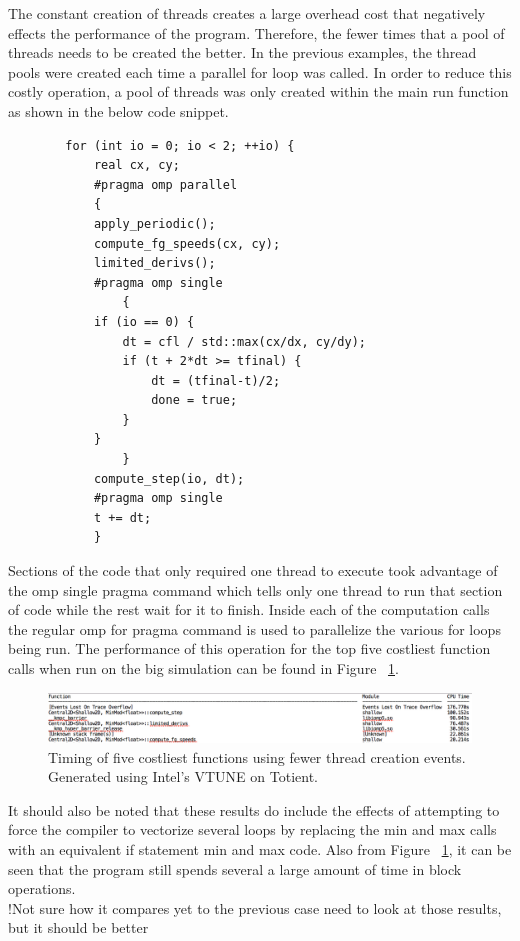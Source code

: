 \documentclass[12pt]{article}
\begin{document}
		The constant creation of threads creates a large overhead cost that negatively effects the performance of the program. Therefore, the fewer times that a pool of threads needs to be created the better. In the previous examples, the thread pools were created each time a parallel for loop was called. In order to reduce this costly operation, a pool of threads was only  created within the main run function as shown in the below code snippet.
		
		\begin{verbatim}
	    for (int io = 0; io < 2; ++io) {
            real cx, cy;
            #pragma omp parallel
            {
            apply_periodic();
            compute_fg_speeds(cx, cy);
            limited_derivs();
            #pragma omp single
                {
            if (io == 0) {
                dt = cfl / std::max(cx/dx, cy/dy);
                if (t + 2*dt >= tfinal) {
                    dt = (tfinal-t)/2;
                    done = true;
                }
            }
                }
            compute_step(io, dt);
            #pragma omp single
            t += dt;
            }

		\end{verbatim}
		
		\noindent Sections of the code that only required one thread to execute took advantage of the omp single pragma command which tells only one thread to run that section of code while the rest wait for it to finish. Inside each of the computation calls the regular omp for pragma command is used to parallelize the various for loops being run. The performance of this operation for the top five costliest function calls when run on the big simulation can be found in Figure ~\ref{ThreadMovement}.
		
		\begin{figure}[h]
			\begin{center}
				\includegraphics[width=0.8\columnwidth]{ThreadMovement}
				\caption{Timing of five costliest functions using fewer thread creation events. Generated using Intel's VTUNE on Totient.}
				\label{ThreadMovement}
			\end{center}
		\end{figure}
		
		\noindent It should also be noted that these results do include the effects of attempting to force the compiler to vectorize several loops by replacing the min and max calls with an equivalent if statement min and max code. Also from Figure ~\ref{ThreadMovement}, it can be seen that the program still spends several a large amount of time in block operations. \\
!Not sure how it compares yet to the previous case need to look at those results, but it should be better
		
\end{document}
